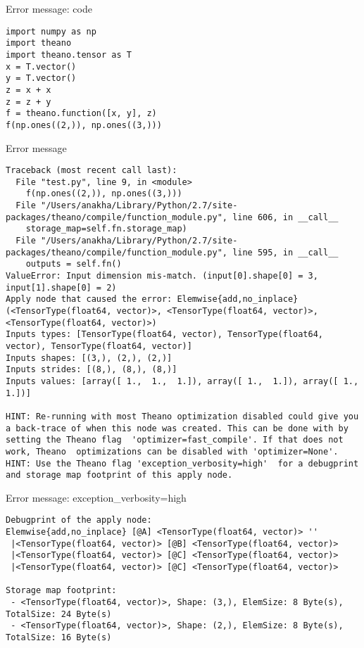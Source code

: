 \documentclass[utf8x,hyperref={pdfpagelabels=false}]{beamer}
\begin{document}
\begin{frame}[fragile]{Error message: code}
\begin{lstlisting}
import numpy as np
import theano
import theano.tensor as T
x = T.vector()
y = T.vector()
z = x + x
z = z + y
f = theano.function([x, y], z)
f(np.ones((2,)), np.ones((3,)))
\end{lstlisting}
\end{frame}

\begin{frame}{Error message}
\vspace{1em}
\begin{lstlisting}[style=output]
Traceback (most recent call last):
  File "test.py", line 9, in <module>
    f(np.ones((2,)), np.ones((3,)))
  File "/Users/anakha/Library/Python/2.7/site-packages/theano/compile/function_module.py", line 606, in __call__
    storage_map=self.fn.storage_map)
  File "/Users/anakha/Library/Python/2.7/site-packages/theano/compile/function_module.py", line 595, in __call__
    outputs = self.fn()
ValueError: Input dimension mis-match. (input[0].shape[0] = 3, input[1].shape[0] = 2)
Apply node that caused the error: Elemwise{add,no_inplace}(<TensorType(float64, vector)>, <TensorType(float64, vector)>, <TensorType(float64, vector)>)
Inputs types: [TensorType(float64, vector), TensorType(float64, vector), TensorType(float64, vector)]
Inputs shapes: [(3,), (2,), (2,)]
Inputs strides: [(8,), (8,), (8,)]
Inputs values: [array([ 1.,  1.,  1.]), array([ 1.,  1.]), array([ 1.,  1.])]

HINT: Re-running with most Theano optimization disabled could give you a back-trace of when this node was created. This can be done with by setting the Theano flag  'optimizer=fast_compile'. If that does not work, Theano  optimizations can be disabled with 'optimizer=None'.
HINT: Use the Theano flag 'exception_verbosity=high'  for a debugprint and storage map footprint of this apply node.
\end{lstlisting}
\end{frame}

\begin{frame}[fragile]{Error message: exception\_verbosity=high}
\begin{lstlisting}[style=output]
Debugprint of the apply node: 
Elemwise{add,no_inplace} [@A] <TensorType(float64, vector)> ''   
 |<TensorType(float64, vector)> [@B] <TensorType(float64, vector)>
 |<TensorType(float64, vector)> [@C] <TensorType(float64, vector)>
 |<TensorType(float64, vector)> [@C] <TensorType(float64, vector)>

Storage map footprint:
 - <TensorType(float64, vector)>, Shape: (3,), ElemSize: 8 Byte(s), TotalSize: 24 Byte(s)
 - <TensorType(float64, vector)>, Shape: (2,), ElemSize: 8 Byte(s), TotalSize: 16 Byte(s)
\end{lstlisting}
\end{frame}
\end{document}
